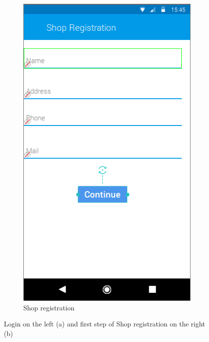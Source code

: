 \begin{figure}[h]
\begin{subfigure}{.5\textwidth}
  \centering
  \includegraphics[height=.4\textheight, keepaspectratio=true]{Img/Mockup_RegistrationShop1}
  \caption{Shop registration}
\end{subfigure}
\caption{Login on the left (a) and first step of Shop registration on the right (b)}
\end{figure}

